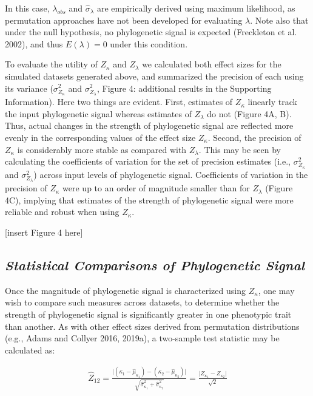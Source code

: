 \documentclass[
]{article}
\begin{document}
{In this case, \(\lambda_{obs}\) and \(\hat\sigma_\lambda\) are
empirically derived using maximum likelihood, as permutation approaches
have not been developed for evaluating \(\lambda\). Note also that under
the null hypothesis, no phylogenetic signal is expected (Freckleton et
al. 2002), and thus \(E(\lambda)=0\) under this condition. \hfill\break

To evaluate the utility of \(Z_\kappa\) and \(Z_\lambda\) we calculated
both effect sizes for the simulated datasets generated above, and
summarized the precision of each using its variance
(\(\sigma^2_{Z_\kappa}\) and \(\sigma^2_{Z_\lambda}\), Figure 4:
additional results in the Supporting Information). Here two things are
evident. First, estimates of \(Z_\kappa\) linearly track the input
phylogenetic signal whereas estimates of \(Z_\lambda\) do not (Figure
4A, B). Thus, actual changes in the strength of phylogenetic signal are
reflected more evenly in the corresponding values of the effect size
\(Z_\kappa\). Second, the precision of \(Z_\kappa\) is considerably more
stable as compared with \(Z_\lambda\). This may be seen by calculating
the coefficients of variation for the set of precision estimates (i.e.,
\(\sigma^2_{Z_\kappa}\) and \(\sigma^2_{Z_\lambda}\)) across input
levels of phylogenetic signal. Coefficients of variation in the
precision of \(Z_\kappa\) were up to an order of magnitude smaller than
for \(Z_\lambda\) (Figure 4C), implying that estimates of the strength
of phylogenetic signal were more reliable and robust when using
\(Z_\kappa\). \hfill\break

{[}insert Figure 4 here{]}

\hypertarget{statistical-comparisons-of-phylogenetic-signal}{%
\subsection{\texorpdfstring{\emph{Statistical Comparisons of
Phylogenetic
Signal}}{Statistical Comparisons of Phylogenetic Signal}}\label{statistical-comparisons-of-phylogenetic-signal}}

Once the magnitude of phylogenetic signal is characterized using
\(Z_\kappa\), one may wish to compare such measures across datasets, to
determine whether the strength of phylogenetic signal is significantly
greater in one phenotypic trait than another. As with other effect sizes
derived from permutation distributions (e.g., Adams and Collyer 2016,
2019a), a two-sample test statistic may be calculated as:

\begin{align}
  \hat{Z}_{12}=\frac{\lvert{(\kappa_{1}-\hat\mu_{\kappa_1})-(\kappa_{2}-\hat\mu_{\kappa_2})}\rvert}{\sqrt{\hat\sigma^2_{\kappa_1}+\hat\sigma^2_{\kappa_2}}} = \frac{\lvert Z_{\kappa_1} - Z_{\kappa_2}\rvert}{\sqrt{2}}
\end{align}

}
\end{document}
